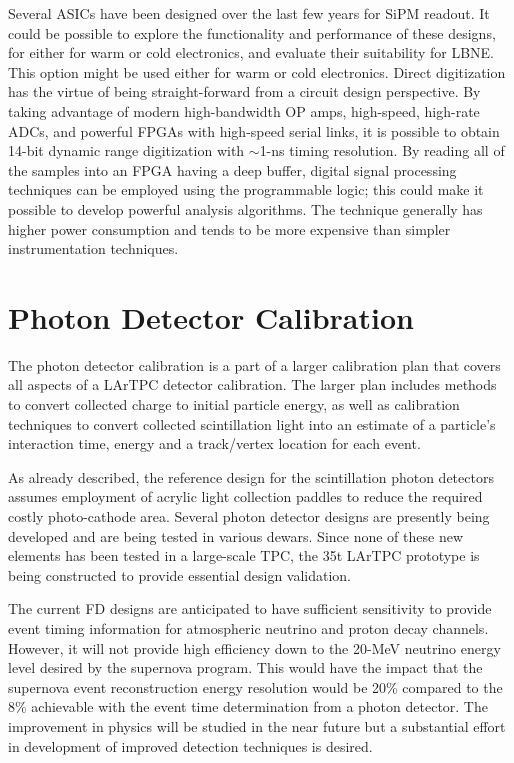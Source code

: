 Several ASICs have been designed over the last few years for SiPM
readout.  It could be possible to explore the functionality and
performance of these designs, for either for warm or cold electronics,
and evaluate their suitability for LBNE. This option might be used
either for warm or cold electronics.  Direct digitization has the
virtue of being straight-forward from a circuit design perspective. By
taking advantage of modern high-bandwidth OP amps, high-speed,
high-rate ADCs, and powerful FPGAs with high-speed serial links, it is
possible to obtain 14-bit dynamic range digitization with $\sim$1-ns
timing resolution.  By reading all of the samples into an FPGA having
a deep buffer, digital signal processing techniques can be employed
using the programmable logic; this could make it possible to develop
powerful analysis algorithms. The technique generally has higher power
consumption and tends to be more expensive than simpler
instrumentation techniques.

\section{Photon Detector Calibration}
\label{sec_pd_calib}

The photon detector calibration is a part of a larger calibration plan
that covers all aspects of a LArTPC detector calibration. The larger
plan includes methods to convert collected charge to initial particle
energy, as well as calibration techniques to convert collected
scintillation light into an estimate of a particle's interaction time,
energy and a track/vertex location for each event.

As already described, the reference design for the scintillation
photon detectors assumes employment of acrylic light collection
paddles to reduce the required costly photo-cathode area. Several
photon detector designs are presently being developed and are being
tested in various dewars. Since none of these new elements has been
tested in a large-scale TPC, the 35t LArTPC prototype is being
constructed to provide essential design validation.

The current FD designs are anticipated to have sufficient sensitivity
to provide event timing information for atmospheric neutrino and
proton decay channels. However, it will not provide high efficiency
down to the 20-MeV neutrino energy level desired by the supernova
program. This would have the impact that the supernova event
reconstruction energy resolution would be 20\% compared to the 8\%
achievable with the event time determination from a photon
detector. The improvement in physics will be studied in the near
future but a substantial effort in development of improved detection
techniques is desired.

